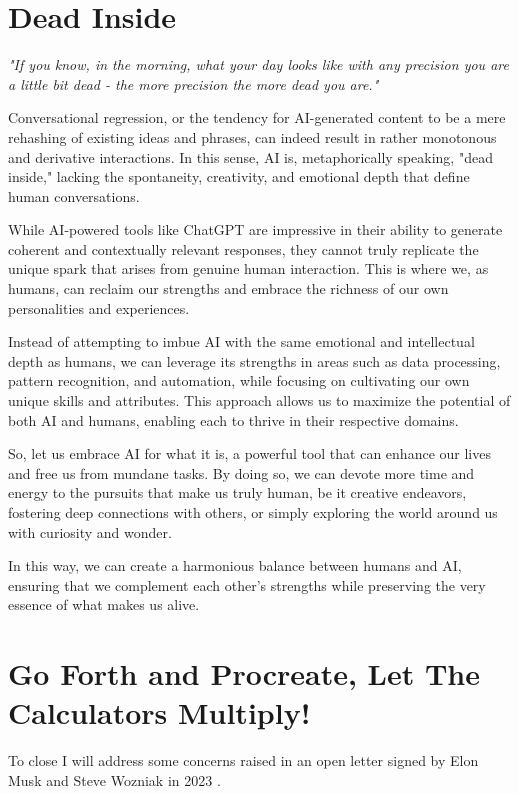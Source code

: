 \section{Dead Inside}

\textit{"If you know, in the morning, what your day looks like with any precision you are a little bit dead - the more precision the more dead you are."}

Conversational regression, or the tendency for AI-generated content to be a mere rehashing of existing ideas and phrases, can indeed result in rather monotonous and derivative interactions. In this sense, AI is, metaphorically speaking, "dead inside," lacking the spontaneity, creativity, and emotional depth that define human conversations.

While AI-powered tools like ChatGPT are impressive in their ability to generate coherent and contextually relevant responses, they cannot truly replicate the unique spark that arises from genuine human interaction. This is where we, as humans, can reclaim our strengths and embrace the richness of our own personalities and experiences.

Instead of attempting to imbue AI with the same emotional and intellectual depth as humans, we can leverage its strengths in areas such as data processing, pattern recognition, and automation, while focusing on cultivating our own unique skills and attributes. This approach allows us to maximize the potential of both AI and humans, enabling each to thrive in their respective domains.

So, let us embrace AI for what it is, a powerful tool that can enhance our lives and free us from mundane tasks. By doing so, we can devote more time and energy to the pursuits that make us truly human, be it creative endeavors, fostering deep connections with others, or simply exploring the world around us with curiosity and wonder.

In this way, we can create a harmonious balance between humans and AI, ensuring that we complement each other's strengths while preserving the very essence of what makes us alive.

\section{Go Forth and Procreate, Let The Calculators Multiply!}

To close I will address some concerns raised in an open letter signed by Elon Musk and Steve Wozniak in 2023 . 

